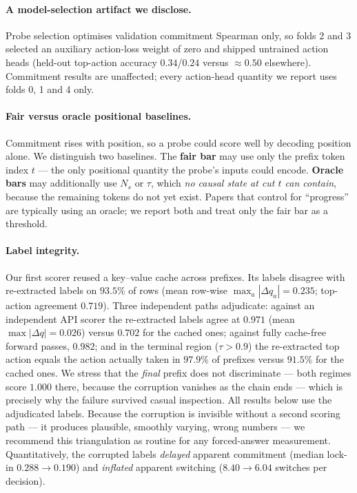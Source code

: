 \documentclass{article}
\begin{document}
\paragraph{A model-selection artifact we disclose.} Probe selection optimises validation
commitment Spearman only, so folds 2 and 3 selected an auxiliary action-loss weight of zero
and shipped untrained action heads (held-out top-action accuracy $0.34$/$0.24$ versus
${\approx}0.50$ elsewhere). Commitment results are unaffected; every action-head quantity we
report uses folds 0, 1 and 4 only.

\paragraph{Fair versus oracle positional baselines.} Commitment rises with position, so a
probe could score well by decoding position alone. We distinguish two baselines. The
\textbf{fair bar} may use only the prefix token index $t$ --- the only positional quantity
the probe's inputs could encode. \textbf{Oracle bars} may additionally use $N_s$ or
$\tau$, which \emph{no causal state at cut $t$ can contain}, because the remaining tokens
do not yet exist. Papers that control for ``progress'' are typically using an oracle; we
report both and treat only the fair bar as a threshold.

\paragraph{Label integrity.}
\label{sec:labels}
Our first scorer reused a key--value cache across prefixes. Its labels disagree with
re-extracted labels on $93.5\%$ of rows (mean row-wise $\max_a|\Delta q_a| = 0.235$;
top-action agreement $0.719$). Three independent paths adjudicate: against an independent
API scorer the re-extracted labels agree at $0.971$ (mean $\max|\Delta q| = 0.026$) versus
$0.702$ for the cached ones; against fully cache-free forward passes, $0.982$; and in the
terminal region ($\tau > 0.9$) the re-extracted top action equals the action actually taken
in $97.9\%$ of prefixes versus $91.5\%$ for the cached ones. We stress that the
\emph{final} prefix does not discriminate --- both regimes score $1.000$ there, because the
corruption vanishes as the chain ends --- which is precisely why the failure survived
casual inspection. All results below use the adjudicated labels.
Because the corruption is invisible without a second scoring path --- it produces
plausible, smoothly varying, wrong numbers --- we recommend this triangulation as routine
for any forced-answer measurement. Quantitatively, the corrupted labels \emph{delayed}
apparent commitment (median lock-in $0.288 \to 0.190$) and \emph{inflated} apparent
switching ($8.40 \to 6.04$ switches per decision).
\end{document}
